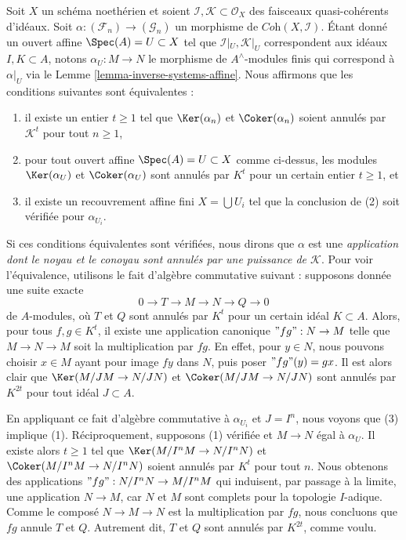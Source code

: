 \begin{remark}
\label{remark-inverse-systems-kernel-cokernel-annihilated-by}
Soit $X$ un schéma noethérien et soient
$\mathcal{I}, \mathcal{K} \subset \mathcal{O}_X$
des faisceaux quasi-cohérents d'idéaux. Soit
$\alpha : (\mathcal{F}_n) \to (\mathcal{G}_n)$ un morphisme de
$\textit{Coh}(X, \mathcal{I})$.
Étant donné un ouvert affine $\Spec(A) = U \subset X$ tel que
$\mathcal{I}|_U, \mathcal{K}|_U$ correspondent aux idéaux $I, K \subset A$,
notons $\alpha_U : M \to N$ le morphisme de $A^\wedge$-modules finis qui
correspond à $\alpha|_U$ via le Lemme \ref{lemma-inverse-systems-affine}.
Nous affirmons que les conditions suivantes sont équivalentes :
\begin{enumerate}
\item il existe un entier $t \geq 1$ tel que
$\Ker(\alpha_n)$ et $\Coker(\alpha_n)$ soient annulés par
$\mathcal{K}^t$ pour tout $n \geq 1$,
\item pour tout ouvert affine $\Spec(A) = U \subset X$ comme ci-dessus,
les modules $\Ker(\alpha_U)$ et $\Coker(\alpha_U)$ sont annulés par
$K^t$ pour un certain entier $t \geq 1$, et
\item il existe un recouvrement affine fini $X = \bigcup U_i$
tel que la conclusion de (2) soit vérifiée pour $\alpha_{U_i}$.
\end{enumerate}
Si ces conditions équivalentes sont vérifiées, nous dirons que
$\alpha$ est une
{\it application dont le noyau et le conoyau sont annulés par une puissance de
$\mathcal{K}$}.
Pour voir l'équivalence, utilisons le fait d'algèbre commutative suivant :
supposons donnée une suite exacte
$$
0 \to T \to M \to N \to Q \to 0
$$
de $A$-modules, où $T$ et $Q$ sont annulés par $K^t$ pour un certain
idéal $K \subset A$. Alors, pour tous $f, g \in K^t$, il existe une
application canonique $"fg": N \to M$ telle que $M \to N \to M$ soit la
multiplication par $fg$. En effet, pour $y \in N$, nous pouvons choisir
$x \in M$ ayant pour image $fy$ dans $N$, puis poser $"fg"(y) = gx$. Il est
alors clair que $\Ker(M/JM \to N/JN)$ et $\Coker(M/JM \to N/JN)$ sont
annulés par $K^{2t}$ pour tout idéal $J \subset A$.

\medskip\noindent
En appliquant ce fait d'algèbre commutative à $\alpha_{U_i}$ et $J = I^n$,
nous voyons que (3) implique (1). Réciproquement,
supposons (1) vérifiée et $M \to N$ égal à $\alpha_U$. Il existe alors
$t \geq 1$ tel que
$\Ker(M/I^nM \to N/I^nN)$ et $\Coker(M/I^nM \to N/I^nN)$ soient annulés
par $K^t$ pour tout $n$. Nous obtenons des applications
$"fg" : N/I^nN \to M/I^nM$ qui induisent, par passage à la limite,
une application $N \to M$, car $N$ et $M$ sont complets pour la topologie
$I$-adique.
Comme le composé $N \to M \to N$ est la multiplication par $fg$, nous
concluons que $fg$ annule $T$ et $Q$. Autrement dit, $T$ et $Q$ sont annulés
par $K^{2t}$, comme voulu.
\end{remark}

